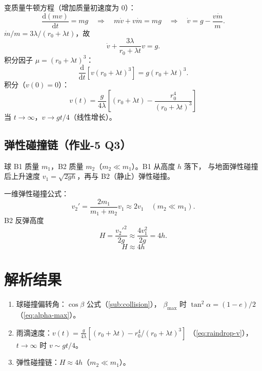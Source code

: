 \documentclass[UTF8,a4paper,11pt]{ctexart}
\begin{document}
变质量牛顿方程（增加质量初速度为 0）：
\begin{equation}
  \frac{\mathrm d(mv)}{\mathrm dt}=mg
  \quad\Longrightarrow\quad
  m\dot v+v\dot m=mg
  \quad\Longrightarrow\quad
  \dot v=g-\frac{v\dot m}{m}.
\end{equation}
$\dot m/m=3\lambda/(r_0+\lambda t)$，故
\begin{equation}
  \dot v+\frac{3\lambda}{r_0+\lambda t}v=g.
\end{equation}
积分因子 $\mu=(r_0+\lambda t)^3$：
\begin{equation}
  \frac{\mathrm d}{\mathrm dt}\left[v(r_0+\lambda t)^3\right]=g(r_0+\lambda t)^3.
\end{equation}
积分（$v(0)=0$）：
\begin{equation}
  \boxed{\;v(t)=\frac{g}{4\lambda}\left[(r_0+\lambda t)-\frac{r_0^4}{(r_0+\lambda t)^3}\right]\;}
  \label{eq:raindrop-v}
\end{equation}
当 $t\to\infty$，$v\to gt/4$（线性增长）。

\subsection{弹性碰撞链（作业-5 Q3）}
\label{sub:chain}

球 B1 质量 $m_1$，B2 质量 $m_2$（$m_2\ll m_1$）。B1 从高度 $h$ 落下，
与地面弹性碰撞后上升速度 $v_1=\sqrt{2gh}$，再与 B2（静止）弹性碰撞。

一维弹性碰撞公式：
\begin{equation}
  v_2'=\frac{2m_1}{m_1+m_2}v_1\approx 2v_1 \quad (m_2\ll m_1).
\end{equation}
B2 反弹高度
\begin{equation}
  H=\frac{v_2'^2}{2g}\approx\frac{4v_1^2}{2g}=4h.
\end{equation}
\begin{equation}
  \boxed{\;H\approx 4h\;}
\end{equation}

\section{解析结果}
\label{sec:result}

\begin{enumerate}
  \item 球碰撞偏转角：$\cos\beta$ 公式（\eqref{sub:collision}），
        $\beta_{\max}$ 时 $\tan^2\alpha=(1-e)/2$（\eqref{eq:alpha-max}）。
  \item 雨滴速度：$v(t)=\frac{g}{4\lambda}[(r_0+\lambda t)-r_0^4/(r_0+\lambda t)^3]$
        （\eqref{eq:raindrop-v}），$t\to\infty$ 时 $v\sim gt/4$。
  \item 弹性碰撞链：$H\approx 4h$（$m_2\ll m_1$）。
\end{enumerate}
\end{document}
